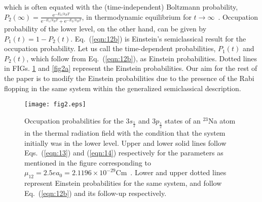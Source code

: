 \documentclass[aps,pra,twocolumn,showpacs,preprintnumbers,amsmath,amssymb,footinbib]{revtex4}
\begin{document}
which is often equated with the (time-independent) Boltzmann probability, $P_2(\infty)=\frac{\text{e}^{-E_2/k_BT}}{\text{e}^{-E_1/k_BT}+\text{e}^{-E_2/k_BT}}$, in thermodynamic equilibrium for $t\rightarrow\infty$~\cite{Einstein,Griffiths}. Occupation probability of the lower level, on the other hand, can be given by $P_1(t)=1-P_2(t)$. Eq.~(\ref{eqn:12b}) is Einstein's semiclassical result for the occupation probability. Let us call the time-dependent probabilities, $P_1(t)$ and $P_2(t)$, which follow from Eq.~(\ref{eqn:12b}), as Einstein probabilities. Dotted lines in FIGs. \ref{fig2} and \ref{fig2a} represent the Einstein probabilities. Our aim for the rest of the paper is to modify the Einstein probabilities due to the presence of the Rabi flopping in the same system within the generalized semiclassical description. 

\begin{figure}
\texttt{[image: fig2.eps]}
\caption{
Occupation probabilities for the $3s_{\frac{1}{2}}$ and $3p_{\frac{1}{2}}$ states of an $^{23}$Na atom in the thermal radiation field with the condition that the system initially was in the lower level. Upper and lower solid lines follow Eqs.~(\ref{eqn:13}) and (\ref{eqn:14}) respectively for the parameters as mentioned in the figure corresponding to $\mu_{12}=2.5ea_0=2.1196\times10^{-29}$Cm~\cite{Boyd}. Lower and upper dotted lines represent Einstein probabilities for the same system, and follow Eq.~(\ref{eqn:12b}) and its follow-up respectively. 
\label{fig2}}
\end{figure}
\end{document}
